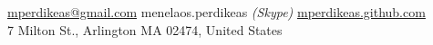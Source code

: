 \documentclass[10pt,a4paper]{article} %
\begin{document}
 



\noindent\href{mailto:mperdikeas@gmail.com}{mperdikeas@gmail.com}\bull %
menelaos.perdikeas \textit{(Skype)}\bull %
\href{http://mperdikeas.github.com}{mperdikeas.github.com}\\ %
7 Milton St., Arlington MA 02474, United States %

\spacedhrule{0.9em}{-0.4em} %



\vspace{-1.3em} %
\end{document}
